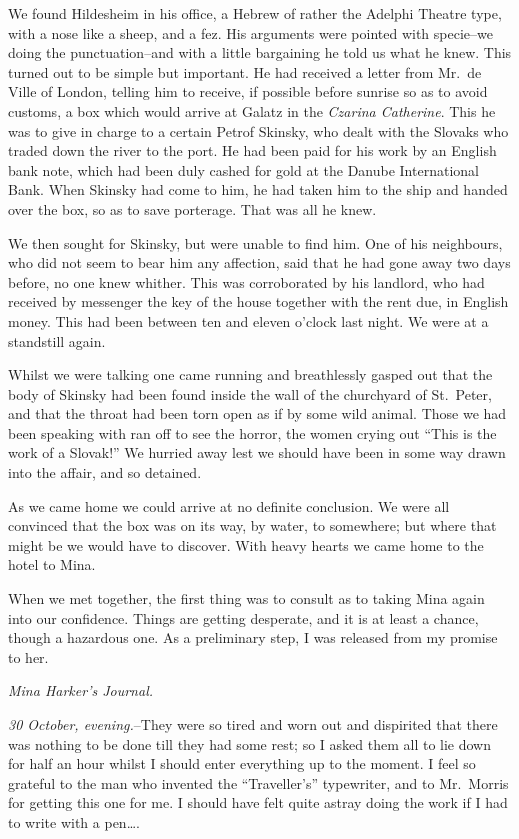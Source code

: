 \documentclass[12pt,openright]{book}
\begin{document}
We found Hildesheim in his office, a Hebrew of rather the Adelphi Theatre type, with a nose like a sheep, and a fez. His arguments were pointed with specie–we doing the punctuation–and with a little bargaining he told us what he knew. This turned out to be simple but important. He had received a letter from Mr. de Ville of London, telling him to receive, if possible before sunrise so as to avoid customs, a box which would arrive at Galatz in the \textit{Czarina Catherine}. This he was to give in charge to a certain Petrof Skinsky, who dealt with the Slovaks who traded down the river to the port. He had been paid for his work by an English bank note, which had been duly cashed for gold at the Danube International Bank. When Skinsky had come to him, he had taken him to the ship and handed over the box, so as to save porterage. That was all he knew.

We then sought for Skinsky, but were unable to find him. One of his neighbours, who did not seem to bear him any affection, said that he had gone away two days before, no one knew whither. This was corroborated by his landlord, who had received by messenger the key of the house together with the rent due, in English money. This had been between ten and eleven o’clock last night. We were at a standstill again.

Whilst we were talking one came running and breathlessly gasped out that the body of Skinsky had been found inside the wall of the churchyard of St. Peter, and that the throat had been torn open as if by some wild animal. Those we had been speaking with ran off to see the horror, the women crying out “This is the work of a Slovak!” We hurried away lest we should have been in some way drawn into the affair, and so detained.

As we came home we could arrive at no definite conclusion. We were all convinced that the box was on its way, by water, to somewhere; but where that might be we would have to discover. With heavy hearts we came home to the hotel to Mina.

When we met together, the first thing was to consult as to taking Mina again into our confidence. Things are getting desperate, and it is at least a chance, though a hazardous one. As a preliminary step, I was released from my promise to her.

\textit{Mina Harker’s Journal.}

\textit{30 October, evening.}–They were so tired and worn out and dispirited that there was nothing to be done till they had some rest; so I asked them all to lie down for half an hour whilst I should enter everything up to the moment. I feel so grateful to the man who invented the “Traveller’s” typewriter, and to Mr. Morris for getting this one for me. I should have felt quite astray doing the work if I had to write with a pen….
\end{document}

